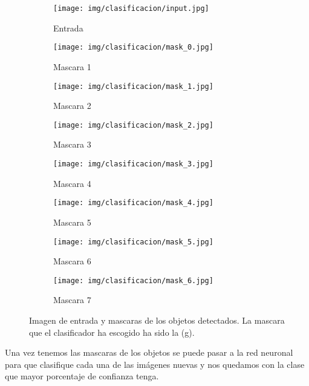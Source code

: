 \documentclass[10pt,a4paper,twocolumn,twoside]{article}
\begin{document}
\begin{figure}[h!]
  \centering
  \begin{subfigure}[b]{0.10\textwidth}
    \texttt{[image: img/clasificacion/input.jpg]}
    \caption{Entrada}
  \end{subfigure}
  \hfill
  \begin{subfigure}[b]{0.10\textwidth}
    \texttt{[image: img/clasificacion/mask\_0.jpg]}
    \caption{Mascara 1}
  \end{subfigure}
  \hfill
  \begin{subfigure}[b]{0.10\textwidth}
    \texttt{[image: img/clasificacion/mask\_1.jpg]}
    \caption{Mascara 2}
  \end{subfigure}
  \hfill
  \begin{subfigure}[b]{0.10\textwidth}
    \texttt{[image: img/clasificacion/mask\_2.jpg]}
    \caption{Mascara 3}
  \end{subfigure}
  
  \vspace{10pt} %
  
  \begin{subfigure}[b]{0.10\textwidth}
    \texttt{[image: img/clasificacion/mask\_3.jpg]}
    \caption{Mascara 4}
  \end{subfigure}
  \hfill
  \begin{subfigure}[b]{0.10\textwidth}
    \texttt{[image: img/clasificacion/mask\_4.jpg]}
    \caption{Mascara 5}
  \end{subfigure}
  \hfill
  \begin{subfigure}[b]{0.10\textwidth}
    \texttt{[image: img/clasificacion/mask\_5.jpg]}
    \caption{Mascara 6}
  \end{subfigure}
  \hfill
  \begin{subfigure}[b]{0.10\textwidth}
    \texttt{[image: img/clasificacion/mask\_6.jpg]}
    \caption{Mascara 7}
  \end{subfigure}
  \caption{Imagen de entrada y mascaras de los objetos detectados. La mascara que el clasificador ha escogido ha sido la (g).}
  \label{fig:clasificacion_sam}
\end{figure}

Una vez tenemos las mascaras de los objetos se puede pasar a la red neuronal
para que clasifique cada una de las imágenes nuevas y nos quedamos con la clase que mayor
porcentaje de confianza tenga.
\end{document}
